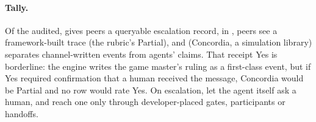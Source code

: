 \paragraph{Tally.}
Of the \wtthAuditN{} audited, \wtthAuditFullVerifyWord{} gives peers a queryable escalation record, in \wtthAuditPartialVerifyWord{}, peers see a framework-built trace (the rubric's Partial), and \wtthAuditChannelWrittenYesWord{} (Concordia, a simulation library) separates channel-written events from agents' claims.
That receipt Yes is borderline: the engine writes the game master's ruling as a first-class event, but if Yes required confirmation that a human received the message, Concordia would be Partial and no row would rate Yes.
On escalation, \wtthAuditEscYesWord{} let the agent itself ask a human, and \wtthAuditEscPartialWord{} reach one only through developer-placed gates, participants or handoffs.

\begin{table}[h]
\centering\scriptsize

\caption{\textbf{Framework audit}, harmonized ratings under the rubric above (re-checked \wtthDesignOssAuditRecheckDate). Evidence names the relevant primitives; numbers in the evidence column are issue or proposal numbers in each project's tracker. Concordia's receipt Yes is borderline (Tally).}
\label{tab:audit}
\end{table}

